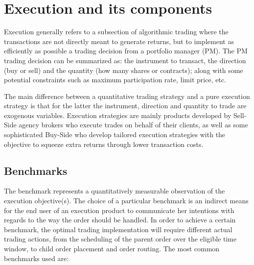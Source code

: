 \section{Execution and its components}

Execution generally refers to a subsection of algorithmic trading where the transactions are not directly meant to generate returns, but to implement as efficiently as possible a trading decision from a portfolio manager (PM). The PM trading decision can be summarized as: the instrument to transact, the direction (buy or sell) and the quantity (how many shares or contracts); along with some potential constraints such as maximum participation rate, limit price, etc.

The main difference between a quantitative trading strategy and a pure execution strategy is that for the latter the instrument, direction and quantity to trade are exogenous variables. Execution strategies are mainly products developed by Sell-Side agency brokers who execute trades on behalf of their clients, as well as some sophisticated Buy-Side who develop tailored execution strategies with the objective to squeeze extra returns through lower transaction costs.

\subsection{Benchmarks}

The benchmark represents a quantitatively measurable observation of the execution objective(s). The choice of a particular benchmark is an indirect means for the end user of an execution product to communicate her intentions with regards to the way the order should be handled. In order to achieve a certain benchmark, the optimal trading implementation will require different actual trading actions, from the scheduling of the parent order over the eligible time window, to child order placement and order routing. The most common benchmarks used are:

